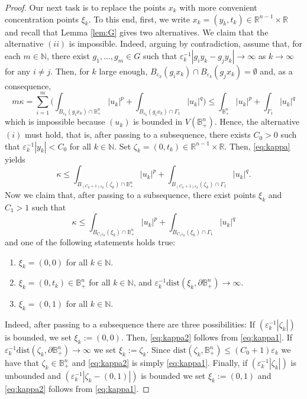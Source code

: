 \documentclass[10pt,a4paper]{amsart}
\def\D{\mathbb{B}^n_+}
\def\dist{\mathrm{dist}}
\def\eps{\varepsilon}
\def\n{\mathbb{N}}
\def\r{\mathbb{R}}
\begin{document}
\begin{proof}
Our next task is to replace the points $x_k$ with more convenient concentration points $\xi_k$. To this end, first, we 
write $x_k=(y_k,t_k)\in\r^{n-1}\times\r$ and recall that Lemma \ref{lem:G} gives two alternatives. We claim that the alternative $(ii)$ is impossible. Indeed, arguing by contradiction, assume that, for each $m\in\n$, there exist $g_1,\ldots,g_m\in G$ such that $\eps_{k}^{-1}|g_iy_k-g_jy_k|\to\infty$ as $k\to\infty$ for any $i\neq j$. Then, for $k$ large enough, $B_{\eps_k}(g_ix_k)\cap B_{\eps_k}(g_jx_k)=\emptyset$ and, as a consequence,
\begin{equation*}
m\kappa=\sum_{i=1}^m\Big(\int_{B_{\eps_k}(g_ix_k)\cap\D}|u_k|^p+\int_{B_{\eps_k}(g_ix_k)\cap\Gamma_1}|u_k|^q\Big)\leq\int_{\D}|u_k|^p+\int_{\Gamma_1}|u_k|^q
\end{equation*}
which is impossible because $(u_k)$ is bounded in $V(\D)$. Hence, the alternative $(i)$ must hold, that is, after passing to a subsequence, there exists $C_0>0$ such that $\eps_k^{-1}|y_k|<C_0$ for all $k\in\n$. Set $\zeta_k=(0,t_k)\in\r^{n-1}\times\r$. Then, \eqref{eq:kappa} yields
\begin{equation} \label{eq:kappa1}
\kappa\leq \int_{B_{(C_0+1)\eps_k}(\zeta_k)\cap\D}|u_k|^p+\int_{B_{(C_0+1)\eps_k}(\zeta_k)\cap\Gamma_1}|u_k|^q.
\end{equation}
Now we claim that, after passing to a subsequence, there exist points $\xi_k$ and $C_1>1$ such that
\begin{equation} \label{eq:kappa2}
\kappa\leq \int_{B_{C_1\eps_k}(\xi_k)\cap\D}|u_k|^p+\int_{B_{C_1\eps_k}(\xi_k)\cap\Gamma_1}|u_k|^q
\end{equation}
and one of the following statements holds true:
\begin{enumerate}
\item $\xi_k=(0,0)$ for all $k\in\n$.
\item $\xi_k=(0,t_k)\in\D$ for all $k\in\n$, and $\eps_k^{-1}\dist(\xi_k,\partial\D)\to\infty$.
\item $\xi_k=(0,1)$ for all $k\in\n$.
\end{enumerate}
Indeed, after passing to a subsequence there are three possibilities: If $(\eps_k^{-1}|\zeta_k|)$ is bounded, we set $\xi_k:=(0,0)$. Then, \eqref{eq:kappa2} follows from \eqref{eq:kappa1}. If $\eps_k^{-1}\dist(\zeta_k,\partial\D)\to\infty$ we set $\xi_k:=\zeta_k$. Since $\dist(\zeta_k,\D)\leq(C_0+1)\eps_k$ we have that $\zeta_k\in\D$ and \eqref{eq:kappa2} is simply \eqref{eq:kappa1}. Finally, if $(\eps_k^{-1}|\zeta_k|)$ is unbounded and $(\eps_k^{-1}|\zeta_k-(0,1)|)$ is bounded we set $\xi_k:=(0,1)$ and \eqref{eq:kappa2} follows from \eqref{eq:kappa1}.


\end{proof}
\end{document}
